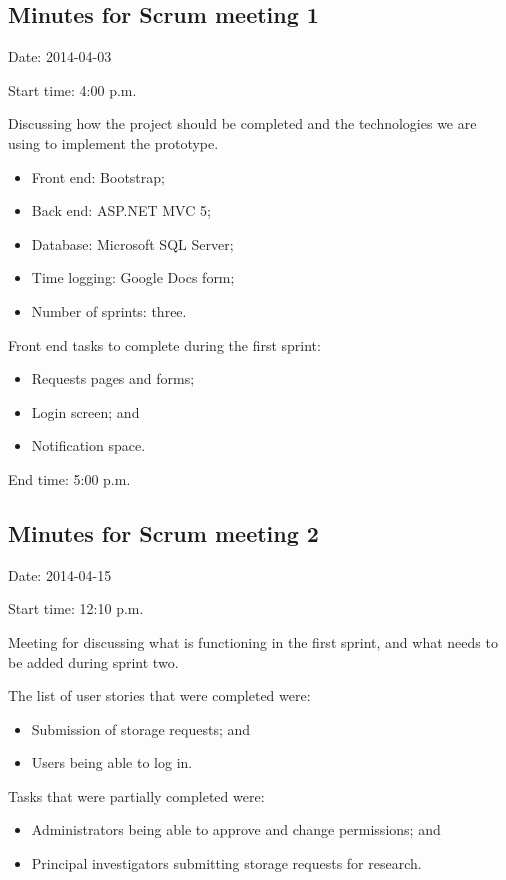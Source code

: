 \documentclass[a4paper,titlepage,12pt]{article}
\begin{document}
\subsection{Minutes for Scrum meeting 1}

Date: 2014-04-03

Start time: 4:00 p.m.

Discussing how the project should be completed and the technologies we are
using to implement the prototype.

\begin{itemize}
	\item Front end: Bootstrap;
	\item Back end: ASP.NET MVC 5;
	\item Database: Microsoft SQL Server;
	\item Time logging: Google Docs form;
	\item Number of sprints: three.
\end{itemize}

Front end tasks to complete during the first sprint:

\begin{itemize}
	\item Requests pages and forms;
	\item Login screen; and
	\item Notification space.
\end{itemize}

End time: 5:00 p.m.

\subsection{Minutes for Scrum meeting 2}

Date: 2014-04-15

Start time: 12:10 p.m.

Meeting for discussing what is functioning in the first sprint, and what needs
to be added during sprint two.

The list of user stories that were completed were:

\begin{itemize}
	\item Submission of storage requests; and
	\item Users being able to log in.
\end{itemize}

Tasks that were partially completed were:

\begin{itemize}
	\item Administrators being able to approve and change permissions; and
	\item Principal investigators submitting storage requests for research.
\end{itemize}
\end{document}
